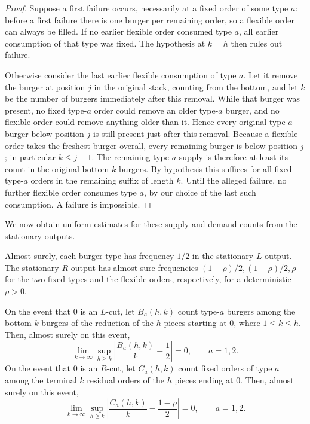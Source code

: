 \begin{proof}
Suppose a first failure occurs, necessarily at a fixed order of some
type $a$: before a first failure there is one burger per remaining order,
so a flexible order can always be filled.
If no earlier flexible order consumed type $a$, all earlier consumption
of that type was fixed. The hypothesis at $k=h$ then rules out failure.

Otherwise consider the last earlier flexible consumption of type $a$.
Let it remove the burger at position $j$ in the original stack, counting
from the bottom, and let $k$ be the number of burgers immediately after
this removal.
While that burger was present, no fixed type-$a$ order could remove an
older type-$a$ burger, and no flexible order could remove anything older
than it. Hence every original type-$a$ burger below position $j$ is
still present just after this removal.
Because a flexible order takes the freshest burger overall, every
remaining burger is below position $j$; in particular $k\le j-1$.
The remaining type-$a$ supply is therefore at least its count in the
original bottom $k$ burgers.
By hypothesis this suffices for all fixed type-$a$ orders in the remaining
suffix of length $k$.
Until the alleged failure, no further flexible order consumes type $a$,
by our choice of the last such consumption. A failure is impossible.
\end{proof}

We now obtain uniform estimates for these supply and demand counts
from the stationary outputs.

\begin{lemma}
\label{ladder:frequencies}
Almost surely, each burger type has frequency $1/2$ in the stationary
$L$-output.
The stationary $R$-output has almost-sure frequencies
$(1-\rho)/2,(1-\rho)/2,\rho$ for the two fixed types and the flexible
orders, respectively, for a deterministic $\rho>0$.

On the event that $0$ is an $L$-cut, let $B_a(h,k)$ count type-$a$ burgers
among the bottom $k$ burgers of the reduction of the $h$ pieces starting
at $0$, where $1\le k\le h$.
Then, almost surely on this event,
\begin{equation}
 \lim_{k\to\infty}\sup_{h\ge k}
 \left|\frac{B_a(h,k)}k-\frac12\right|=0,
 \qquad a=1,2.
 \label{ladder:left-counts}
\end{equation}
On the event that $0$ is an $R$-cut, let $C_a(h,k)$ count fixed orders of
type $a$ among the terminal $k$ residual orders of the $h$ pieces ending
at $0$.
Then, almost surely on this event,
\begin{equation}
 \lim_{k\to\infty}\sup_{h\ge k}
 \left|\frac{C_a(h,k)}k-\frac{1-\rho}{2}\right|=0,
 \qquad a=1,2.
 \label{ladder:right-counts}
\end{equation}
\end{lemma}

